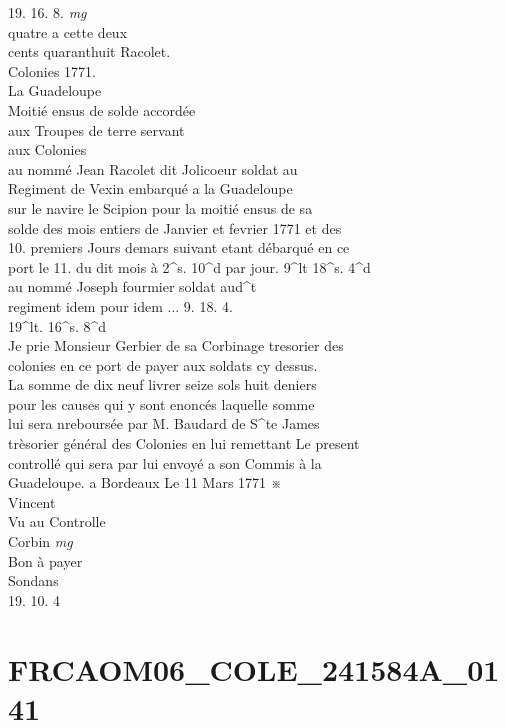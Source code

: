 \documentclass{article}
\begin{document}
\begin{pages}
19. 16. 8.
\normalsize 
\vspace{0.5cm}\noindent
\textit{mg}
\footnotesize \\
quatre a cette deux\\
cents quaranthuit
\normalsize \pstart
Racolet.\\
Colonies 1771.\\
La Guadeloupe\\
Moitié ensus de solde accordée\\
aux Troupes de terre servant\\
aux Colonies\\
au nommé Jean Racolet dit Jolicoeur soldat au\\
Regiment de Vexin embarqué a la Guadeloupe\\
sur le navire le Scipion pour la moitié ensus de sa\\
solde des mois entiers de Janvier et fevrier 1771 et des\\
10. premiers Jours demars suivant etant débarqué en ce\\
port le 11. du dit mois à 2\^{}s. 10\^{}d par jour. 9\^{}lt 18\^{}s. 4\^{}d\\
au nommé Joseph fourmier soldat aud\^{}t\\
regiment idem pour idem ... 9. 18. 4.\\
19\^{}lt. 16\^{}s. 8\^{}d\\
Je prie Monsieur Gerbier de sa Corbinage tresorier des\\
colonies en ce port de payer aux soldats cy dessus.\\
La somme de dix neuf livrer seize sols huit deniers\\
pour les causes qui y sont enoncés laquelle somme\\
lui sera nreboursée par M. Baudard de S\^{}te James\\
trèsorier général des Colonies en lui remettant Le present\\
controllé qui sera par lui envoyé a son Commis à la\\
Guadeloupe. a Bordeaux Le 11 Mars 1771 ※\\
Vincent\\
Vu au Controlle\\
Corbin
\pend
\vspace{0.5cm}\noindent
\textit{mg}
\footnotesize \\
Bon à payer\\
Sondans\\
19. 10. 4
\normalsize 
\endnumbering\beginnumbering\section{FRCAOM06\_COLE\_241584A\_0141}\pstart

\end{pages}
\end{document}
